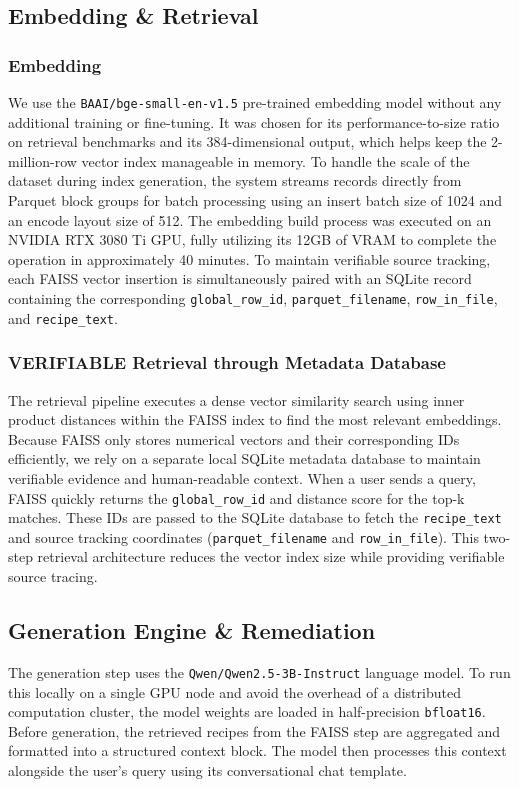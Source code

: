 \documentclass[paper=a4, fontsize=11pt]{scrartcl} %
\begin{document}
\subsection{Embedding \& Retrieval}
\subsubsection*{Embedding}
We use the \texttt{BAAI/bge-small-en-v1.5} pre-trained embedding model without any additional training or fine-tuning. It was chosen for its performance-to-size ratio on retrieval benchmarks and its 384-dimensional output, which helps keep the 2-million-row vector index manageable in memory. To handle the scale of the dataset during index generation, the system streams records directly from Parquet block groups for batch processing using an insert batch size of 1024 and an encode layout size of 512. The embedding build process was executed on an NVIDIA RTX 3080 Ti GPU, fully utilizing its 12GB of VRAM to complete the operation in approximately 40 minutes.
To maintain verifiable source tracking, each FAISS vector insertion is simultaneously paired with an SQLite record containing the corresponding \texttt{global\_row\_id}, \texttt{parquet\_filename}, \texttt{row\_in\_file}, and \texttt{recipe\_text}.

\subsubsection*{VERIFIABLE Retrieval through Metadata Database}
The retrieval pipeline executes a dense vector similarity search using inner product distances within the FAISS index to find the most relevant embeddings. Because FAISS only stores numerical vectors and their corresponding IDs efficiently, we rely on a separate local SQLite metadata database to maintain verifiable evidence and human-readable context. When a user sends a query, FAISS quickly returns the \texttt{global\_row\_id} and distance score for the top-k matches. These IDs are passed to the SQLite database to fetch the \texttt{recipe\_text} and source tracking coordinates (\texttt{parquet\_filename} and \texttt{row\_in\_file}). This two-step retrieval architecture reduces the vector index size while providing verifiable source tracing.

\subsection{Generation Engine \& Remediation}
The generation step uses the \texttt{Qwen/Qwen2.5-3B-Instruct} language model. To run this locally on a single GPU node and avoid the overhead of a distributed computation cluster, the model weights are loaded in half-precision \texttt{bfloat16}. Before generation, the retrieved recipes from the FAISS step are aggregated and formatted into a structured context block. The model then processes this context alongside the user's query using its conversational chat template.
\end{document}
